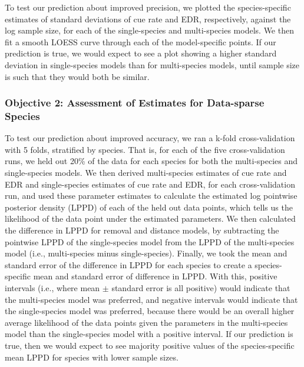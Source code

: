 \par To test our prediction about improved precision, we plotted the species-specific estimates of standard deviations of cue rate and EDR, respectively, against the log sample size, for each of the single-species and multi-species models.
We then fit a smooth LOESS curve through each of the model-specific points.
If our prediction is true, we would expect to see a plot showing a higher standard deviation in single-species models than for multi-species models, until sample size is such that they would both be similar.

\subsubsection{Objective 2: Assessment of Estimates for Data-sparse Species}

\par To test our prediction about improved accuracy, we ran a k-fold cross-validation with 5 folds, stratified by species.
That is, for each of the five cross-validation runs, we held out 20\% of the data for each species for both the multi-species and single-species models. 
We then derived multi-species estimates of cue rate and EDR and single-species estimates of cue rate and EDR, for each cross-validation run, and used these parameter estimates to calculate the estimated log pointwise posterior density (LPPD) of each of the held out data points, which tells us the likelihood of the data point under the estimated parameters.
We then calculated the difference in LPPD for removal and distance models, by subtracting the pointwise LPPD of the single-species model from the LPPD of the multi-species model (i.e., multi-species minus single-species).
Finally, we took the mean and standard error of the difference in LPPD for each species to create a species-specific mean and standard error of difference in LPPD.
With this, positive intervals (i.e., where mean $\pm$ standard error is all positive) would indicate that the multi-species model was preferred, and negative intervals would indicate that the single-species model was preferred, because there would be an overall higher average likelihood of the data points given the parameters in the multi-species model than the single-species model with a positive interval.
If our prediction is true, then we would expect to see majority positive values of the species-specific mean LPPD for species with lower sample sizes.

